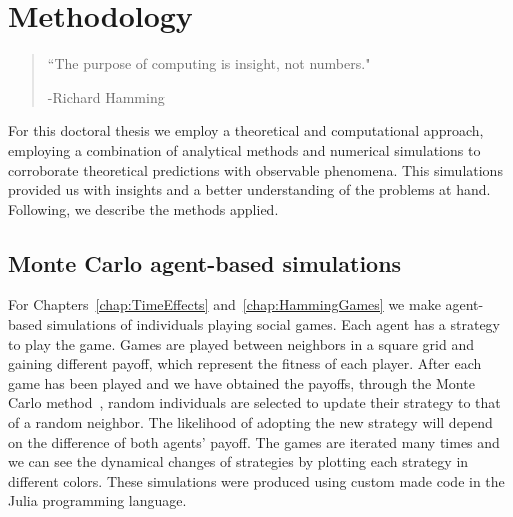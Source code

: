 \chapter{Methodology}
\label{chap:Method}


\begin{quotation}


	\vspace{-3cm}


    \begin{flushright}
    \begin{minipage}[t][5cm][b]{0.5\textwidth}
    { ``The purpose of computing is insight, not numbers."}
    
    \bigskip
    
    -{\small  Richard Hamming}
    \end{minipage}
    \end{flushright}
    
    \vspace{0.5cm}
\end{quotation}





For this doctoral thesis we employ a theoretical and computational approach, employing a combination of analytical methods and numerical simulations to corroborate theoretical predictions with observable phenomena. This simulations provided us with insights and a better understanding of the problems at hand. Following, we describe the methods applied.


\section{Monte Carlo agent-based simulations}

For Chapters~\ref{chap:TimeEffects} and~\ref{chap:HammingGames} we make agent-based simulations of individuals playing social games. Each agent has a strategy to play the game. Games are played between neighbors in a square grid and gaining different payoff, which represent the fitness of each player. After each game has been played and we have obtained the payoffs, through the Monte Carlo method~\cite{MonteCarlo}, random individuals are selected to update their strategy to that of a random neighbor. The likelihood of adopting the new strategy will depend on the difference of both agents' payoff. The games are iterated many times and we can see the dynamical changes of strategies by plotting each strategy in different colors. These simulations were produced using custom made code in the Julia programming language.

